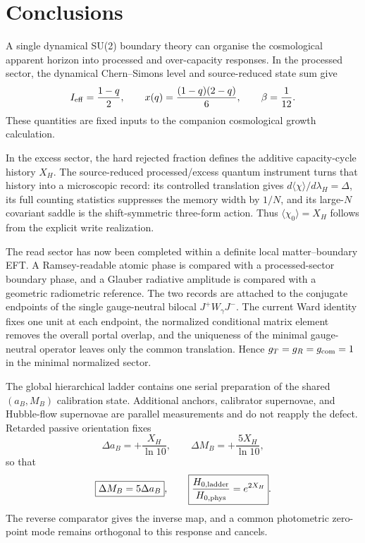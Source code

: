 \documentclass[aps,prd,twocolumn,10pt,superscriptaddress,nofootinbib]{revtex4-2}
\begin{document}
\section{Conclusions}
\label{sec:conclusion}

A single dynamical SU(2) boundary theory can organise the cosmological
apparent horizon into processed and over-capacity responses.  In the
processed sector, the dynamical Chern--Simons level and source-reduced state
sum give
\begin{equation}
I_{\rm eff}=\frac{1-q}{2},\qquad
x(q)=\frac{(1-q)(2-q)}6,\qquad
\beta=\frac1{12}.
\end{equation}
These quantities are fixed inputs to the companion cosmological growth
calculation.

In the excess sector, the hard rejected fraction defines the additive
capacity-cycle history $X_H$.  The source-reduced processed/excess quantum
instrument turns that history into a microscopic record: its controlled
translation gives $d\langle\chi\rangle/d\lambda_H=\Delta$, its full counting
statistics suppresses the memory width by $1/N$, and its large-$N$ covariant
saddle is the shift-symmetric three-form action.  Thus
$\langle\chi_0\rangle=X_H$ follows from the explicit write realization.

The read sector has now been completed within a definite local
matter--boundary EFT.  A Ramsey-readable atomic phase is compared with a
processed-sector boundary phase, and a Glauber radiative amplitude is
compared with a geometric radiometric reference.  The two records are
attached to the conjugate endpoints of the single gauge-neutral bilocal
$J^+W_\gamma J^-$.  The current Ward identity fixes one unit at each
endpoint, the normalized conditional matrix element removes the overall
portal overlap, and the uniqueness of the minimal gauge-neutral operator leaves only the common
translation.  Hence $g_T=g_R=g_{\rm com}=1$ in the minimal normalized
sector.

The global hierarchical ladder contains one serial preparation of the
shared $(a_B,M_B)$ calibration state.  Additional anchors, calibrator
supernovae, and Hubble-flow supernovae are parallel measurements and do not
reapply the defect.  Retarded passive orientation fixes
\begin{equation}
\Delta a_B=+\frac{X_H}{\ln10},\qquad
\Delta M_B=+\frac{5X_H}{\ln10},
\end{equation}
so that
\begin{equation}
\boxed{\Delta M_B=5\Delta a_B},\qquad
\boxed{\frac{H_{0,\rm ladder}}{H_{0,\rm phys}}=e^{2X_H}}.
\end{equation}
The reverse comparator gives the inverse map, and a common photometric
zero-point mode remains orthogonal to this response and cancels.
\end{document}
